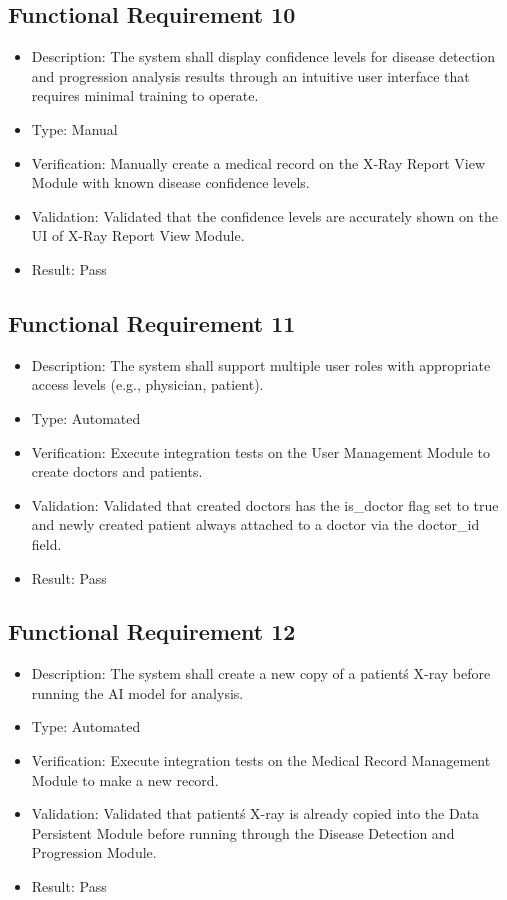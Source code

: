 \documentclass[12pt, titlepage]{article}
\begin{document}
\subsection{Functional Requirement 10}
\begin{itemize}  
  \item Description: The system shall display confidence levels for disease detection and progression analysis results through an intuitive user interface that requires minimal training to operate.
  \item Type: Manual
  \item Verification: Manually create a medical record on the X-Ray Report View Module with known disease confidence levels.
  \item Validation: Validated that the confidence levels are accurately shown on the UI of X-Ray Report View Module.
  \item Result: Pass
\end{itemize}

\subsection{Functional Requirement 11}
\begin{itemize}  
  \item Description: The system shall support multiple user roles with appropriate access levels (e.g., physician, patient).
  \item Type: Automated
  \item Verification: Execute integration tests on the User Management Module to create doctors and patients.
  \item Validation: Validated that created doctors has the is_doctor flag set to true and newly created patient always attached to a doctor via the doctor_id field.
  \item Result: Pass
\end{itemize}

\subsection{Functional Requirement 12}
\begin{itemize}  
  \item Description: The system shall create a new copy of a patient\'s X-ray before running the AI model for analysis.
  \item Type: Automated
  \item Verification: Execute integration tests on the Medical Record Management Module to make a new record.
  \item Validation: Validated that patient\'s X-ray is already copied into the Data Persistent Module before running through the Disease Detection and Progression Module.
  \item Result: Pass
\end{itemize}
\end{document}
